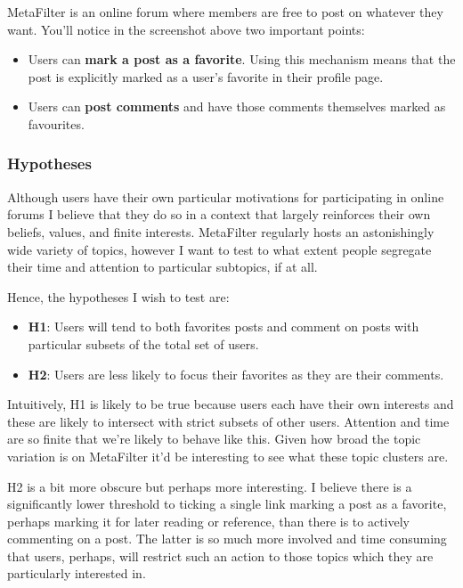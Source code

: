 MetaFilter is an online forum where members are free to post on whatever
they want. You'll notice in the screenshot above two important points:

\begin{itemize}
\item
  Users can \textbf{mark a post as a favorite}. Using this mechanism
  means that the post is explicitly marked as a user's favorite in their
  profile page.
\item
  Users can \textbf{post comments} and have those comments themselves
  marked as favourites.
\end{itemize}

\subsubsection{Hypotheses}

Although users have their own particular motivations for participating
in online forums I believe that they do so in a context that largely
reinforces their own beliefs, values, and finite interests. MetaFilter
regularly hosts an astonishingly wide variety of topics, however I want
to test to what extent people segregate their time and attention to
particular subtopics, if at all.

Hence, the hypotheses I wish to test are:

\begin{itemize}
\item
  \textbf{H1}: Users will tend to both favorites posts and comment on
  posts with particular subsets of the total set of users.
\item
  \textbf{H2}: Users are less likely to focus their favorites as they
  are their comments.
\end{itemize}

Intuitively, H1 is likely to be true because users each have their own
interests and these are likely to intersect with strict subsets of other
users. Attention and time are so finite that we're likely to behave like
this. Given how broad the topic variation is on MetaFilter it'd be
interesting to see what these topic clusters are.

H2 is a bit more obscure but perhaps more interesting. I believe there
is a significantly lower threshold to ticking a single link marking a
post as a favorite, perhaps marking it for later reading or reference,
than there is to actively commenting on a post. The latter is so much
more involved and time consuming that users, perhaps, will restrict such
an action to those topics which they are particularly interested in.

